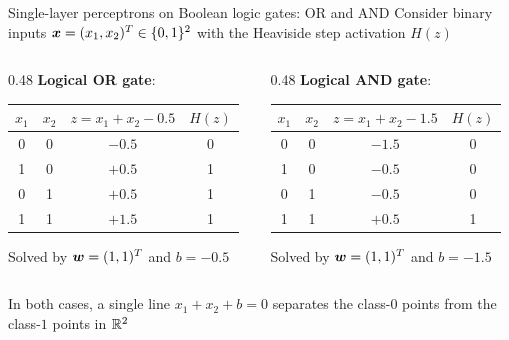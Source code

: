 \documentclass[aspectratio=169]{beamer}\usepackage[]{graphicx}\usepackage[]{xcolor}
\begin{document}
\begin{frame}{Single-layer perceptrons on Boolean logic gates: OR and AND}
Consider binary inputs $\bm{x} = (x_1, x_2)^T \in \{0, 1\}^2$ with the Heaviside step activation $H(z)$
\vfill
\begin{columns}[t]
\begin{column}{0.48\textwidth}
\textbf{Logical OR gate}:
\begin{center}
\begin{tabular}{cc|c|c}
\toprule
$x_1$ & $x_2$ & $z = x_1 + x_2 - 0.5$ & $H(z)$ \\
\midrule
0 & 0 & $-0.5$ & 0 \\
1 & 0 & $+0.5$ & 1 \\
0 & 1 & $+0.5$ & 1 \\
1 & 1 & $+1.5$ & 1 \\
\bottomrule
\end{tabular}
\end{center}
Solved by $\bm{w} = (1, 1)^T$ and $b = -0.5$
\end{column}
\begin{column}{0.48\textwidth}
\textbf{Logical AND gate}:
\begin{center}
\begin{tabular}{cc|c|c}
\toprule
$x_1$ & $x_2$ & $z = x_1 + x_2 - 1.5$ & $H(z)$ \\
\midrule
0 & 0 & $-1.5$ & 0 \\
1 & 0 & $-0.5$ & 0 \\
0 & 1 & $-0.5$ & 0 \\
1 & 1 & $+0.5$ & 1 \\
\bottomrule
\end{tabular}
\end{center}
Solved by $\bm{w} = (1, 1)^T$ and $b = -1.5$
\end{column}
\end{columns}
\vfill
In both cases, a single line $x_1 + x_2 + b = 0$ separates the class-$0$ points from the class-$1$ points in $\mathbb{R}^2$
\end{frame}
\end{document}
